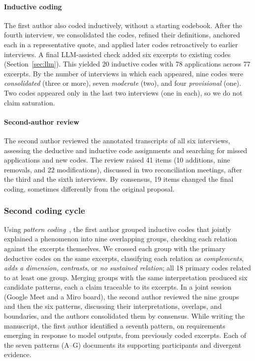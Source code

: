 \documentclass[sigconf,nonacm]{acmart}
\begin{document}
\paragraph{Inductive coding}
The first author also coded inductively, without a starting codebook. After the fourth interview, we consolidated the codes, refined their definitions, anchored each in a representative quote, and applied later codes retroactively to earlier interviews. A final LLM-assisted check added six excerpts to existing codes (Section~\ref{sec:llm}). This yielded 20 inductive codes with 78 applications across 77 excerpts. By the number of interviews in which each appeared, nine codes were \emph{consolidated} (three or more), seven \emph{moderate} (two), and four \emph{provisional} (one). Two codes appeared only in the last two interviews (one in each), so we do not claim saturation.

\paragraph{Second-author review}
The second author reviewed the annotated transcripts of all six interviews, assessing the deductive and inductive code assignments and searching for missed applications and new codes. The review raised 41 items (10 additions, nine removals, and 22 modifications), discussed in two reconciliation meetings, after the third and the sixth interviews. By consensus, 19 items changed the final coding, sometimes differently from the original proposal.

\subsubsection{Second coding cycle}
Using \emph{pattern coding}~\cite{saldana2009coding}, the first author grouped inductive codes that jointly explained a phenomenon into nine overlapping groups, checking each relation against the excerpts themselves. We crossed each group with the primary deductive codes on the same excerpts, classifying each relation as \emph{complements}, \emph{adds a dimension}, \emph{contrasts}, or \emph{no sustained relation}; all 18 primary codes related to at least one group. Merging groups with the same interpretation produced six candidate patterns, each a claim traceable to its excerpts. In a joint session (Google Meet and a Miro board), the second author reviewed the nine groups and then the six patterns, discussing their interpretations, overlaps, and boundaries, and the authors consolidated them by consensus. While writing the manuscript, the first author identified a seventh pattern, on requirements emerging in response to model outputs, from previously coded excerpts. Each of the seven patterns (A--G) documents its supporting participants and divergent evidence.
\end{document}
